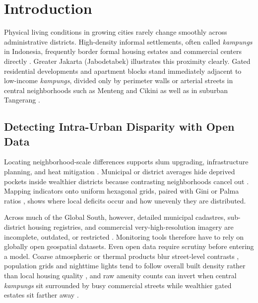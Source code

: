 \section{Introduction}

Physical living conditions in growing cities rarely change smoothly across administrative districts. High-density informal settlements, often called \textit{kampungs} in Indonesia, frequently border formal housing estates and commercial centers directly \citep{Kuffer2016, Taubenbock2018}. Greater Jakarta (Jabodetabek) illustrates this proximity clearly. Gated residential developments and apartment blocks stand immediately adjacent to low-income \textit{kampungs}, divided only by perimeter walls or arterial streets in central neighborhoods such as Menteng and Cikini as well as in suburban Tangerang \citep{Hidayati2020, Mardhotillah2018, Wardhani2016}.

\subsection{Detecting Intra-Urban Disparity with Open Data}
Locating neighborhood-scale differences supports slum upgrading, infrastructure planning, and heat mitigation \citep{Abascal2022a, Chakraborty2019b, Hsu2021, Leonita2018}. Municipal or district averages hide deprived pockets inside wealthier districts because contrasting neighborhoods cancel out \citep{Openshaw1984, Reardon2004}. Mapping indicators onto uniform hexagonal grids, paired with Gini or Palma ratios \citep{Mahajan2024, Rey2013}, shows where local deficits occur and how unevenly they are distributed.

Across much of the Global South, however, detailed municipal cadastres, sub-district housing registries, and commercial very-high-resolution imagery are incomplete, outdated, or restricted \citep{Herfort2023, Thomson2020}. Monitoring tools therefore have to rely on globally open geospatial datasets. Even open data require scrutiny before entering a model. Coarse atmospheric or thermal products blur street-level contrasts \citep{vanDonkelaar2021, Voogt2003}, population grids and nighttime lights tend to follow overall built density rather than local housing quality \citep{Gibson2021, Pesaresi2024}, and raw amenity counts can invert when central \textit{kampungs} sit surrounded by busy commercial streets while wealthier gated estates sit farther away \citep{Hidayati2020}.

